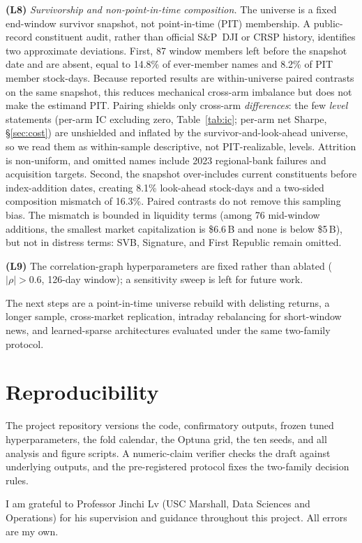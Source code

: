 \documentclass[sigconf,nonacm]{acmart}
\begin{document}
\textbf{(L8)} \emph{Survivorship and non-point-in-time composition.} The universe is a fixed end-window survivor snapshot, not point-in-time (PIT) membership. A public-record constituent audit, rather than official S\&P~DJI or CRSP history, identifies two approximate deviations. First, 87 window members left before the snapshot date and are absent, equal to 14.8\% of ever-member names and 8.2\% of PIT member stock-days. Because reported results are within-universe paired contrasts on the same snapshot, this reduces mechanical cross-arm imbalance but does not make the estimand PIT. Pairing shields only cross-arm \emph{differences}: the few \emph{level} statements (per-arm IC excluding zero, Table~\ref{tab:ic}; per-arm net Sharpe, \S\ref{sec:cost}) are unshielded and inflated by the survivor-and-look-ahead universe, so we read them as within-sample descriptive, not PIT-realizable, levels. Attrition is non-uniform, and omitted names include 2023 regional-bank failures and acquisition targets. Second, the snapshot over-includes current constituents before index-addition dates, creating 8.1\% look-ahead stock-days and a two-sided composition mismatch of 16.3\%. Paired contrasts do not remove this sampling bias. The mismatch is bounded in liquidity terms (among 76 mid-window additions, the smallest market capitalization is \$6.6\,B and none is below \$5\,B), but not in distress terms: SVB, Signature, and First Republic remain omitted.

\textbf{(L9)} The correlation-graph hyperparameters are fixed rather than ablated ($|\rho|>0.6$, 126-day window); a sensitivity sweep is left for future work.

The next steps are a point-in-time universe rebuild with delisting returns, a longer sample, cross-market replication, intraday rebalancing for short-window news, and learned-sparse architectures evaluated under the same two-family protocol.

\section{Reproducibility}\label{sec:repro}
The project repository versions the code, confirmatory outputs, frozen tuned hyperparameters, the fold calendar, the Optuna grid, the ten seeds, and all analysis and figure scripts. A numeric-claim verifier checks the draft against underlying outputs, and the pre-registered protocol fixes the two-family decision rules.

\begin{acks}
I am grateful to Professor Jinchi Lv (USC Marshall, Data Sciences and Operations) for his supervision and guidance throughout this project. All errors are my own.
\end{acks}

\begingroup
\scriptsize
\setlength{\bibsep}{0pt}


\endgroup
\end{document}
